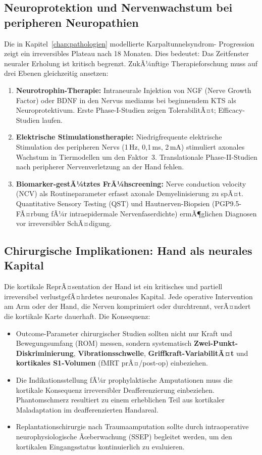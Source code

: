﻿\documentclass[12pt,a4paper]{report}
\theoremstyle{plain}
\theoremstyle{definition}
\theoremstyle{remark}
\begin{document}
\subsection{Neuroprotektion und Nervenwachstum bei peripheren Neuropathien}

Die in Kapitel~\ref{chap:pathologien} modellierte Karpaltunnelsyndrom-
Progression zeigt ein irreversibles Plateau nach 18 Monaten. Dies bedeutet:
Das Zeitfenster neuraler Erholung ist kritisch begrenzt. ZukÃ¼nftige
Therapieforschung muss auf drei Ebenen gleichzeitig ansetzen:

\begin{enumerate}
\item \textbf{Neurotrophin-Therapie:} Intraneurale Injektion von NGF
  (Nerve Growth Factor) oder BDNF in den Nervus medianus bei beginnendem
  KTS als Neuroprotektivum. Erste Phase-I-Studien zeigen TolerabilitÃ¤t;
  Efficacy-Studien laufen.
\item \textbf{Elektrische Stimulationstherapie:} Niedrigfrequente
  elektrische Stimulation des peripheren Nervs (1\,Hz, 0{,}1\,ms, 2\,mA)
  stimuliert axonales Wachstum in Tiermodellen um den Faktor~3.
  Translationale Phase-II-Studien nach peripherer Nervenverletzung
  an der Hand fehlen.
\item \textbf{Biomarker-gestÃ¼tztes FrÃ¼hscreening:} Nerve conduction
  velocity (NCV) als Routineparameter erfasst axonale Demyelinisierung
  zu spÃ¤t. Quantitative Sensory Testing (QST) und Hautnerven-Biopsien
  (PGP9.5-FÃ¤rbung fÃ¼r intraepidermale Nervenfaserdichte) ermÃ¶glichen
  Diagnosen vor irreversibler SchÃ¤digung.
\end{enumerate}

\subsection{Chirurgische Implikationen: Hand als neurales Kapital}

Die kortikale ReprÃ¤sentation der Hand ist ein kritisches und partiell
irreversibel verlustgefÃ¤hrdetes neuronales Kapital. Jede operative
Intervention am Arm oder der Hand, die Nerven komprimiert oder
durchtrennt, verÃ¤ndert die kortikale Karte dauerhaft. Die Konsequenz:

\begin{itemize}
\item Outcome-Parameter chirurgischer Studien sollten nicht nur
  Kraft und Bewegungsumfang (ROM) messen, sondern systematisch
  \textbf{Zwei-Punkt-Diskriminierung}, \textbf{Vibrationsschwelle},
  \textbf{Griffkraft-VariabilitÃ¤t} und \textbf{kortikales S1-Volumen}
  (fMRT prÃ¤/post-op) einbeziehen.
\item Die Indikationsstellung fÃ¼r prophylaktische Amputationen muss
  die kortikale Konsequenz irreversibler Deafferenzierung einbeziehen.
  Phantomschmerz resultiert zu einem erheblichen Teil aus kortikaler
  Maladaptation im deafferenzierten Handareal.
\item Replantationschirurgie nach Traumaamputation sollte durch
  intraoperative neurophysiologische Ãœberwachung (SSEP) begleitet
  werden, um den kortikalen Eingangsstatus kontinuierlich zu evaluieren.
\end{itemize}
\end{document}
